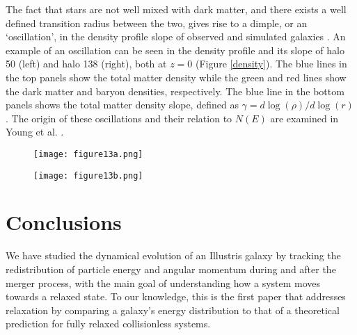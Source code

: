 \documentclass[a4paper,11pt]{article}
\begin{document}
The fact that stars are not well mixed with dark matter, and there exists a well defined transition radius between the two, gives rise to a dimple, or an 
`oscillation', in the density profile slope of observed \citep{Cha14,Tho07} and simulated galaxies \citep{Sch15a, Xu17}.  An 
example of an oscillation can be seen in the density profile and its slope of halo 50 (left) and halo 138 (right), both at $z=0$ (Figure \ref{density}).  The 
blue lines in the top panels show the total matter density while the green and red lines show the dark matter and baryon 
densities, respectively.  The blue line in the bottom panels shows the total matter density slope, defined as $\gamma=d\log(\rho)/d\log(r)$.  The origin of 
these oscillations and their relation to $N(E)$ are examined in Young et al. \citep{You16}. 

\begin{figure*}
\centering
\begin{subfigure}{.5\textwidth}
  \centering
\texttt{[image: figure13a.png]}
  \label{fig:sub1}
\end{subfigure}%
\begin{subfigure}{.5\textwidth}
  \centering
\texttt{[image: figure13b.png]}
  \label{fig:sub2}
\end{subfigure}
\caption{Top: The density profile for Illustris-1 halo 50 (left) and halo 138 (right) at $z=0$.  The blue line is the total matter profile while the green is 
dark matter, and the red is baryons. Bottom: The total matter density profile slope, where $\gamma=d\log(\rho)/d\log(r)$. For halo 50, there is a feature at 
$\log[r/(\text{kpc}/h)]\sim 0.25$ in the density profile slope indicating the dark matter to baryon transition region. This feature is not as pronounced in the halo 138 
density profile slope.  The dashed line and the dashed-dot line represent the softening length parameter for dark matter and baryons respectively.}
\label{density}
\end{figure*}


\section{Conclusions}\label{Conclusions}

We have studied the dynamical evolution of an Illustris galaxy by tracking the redistribution of particle energy and angular momentum during and after the 
merger process, with the main goal of understanding how a system moves towards a relaxed state.  To our knowledge, this is the first paper that addresses 
relaxation by comparing a galaxy's energy distribution to that of a theoretical prediction for fully relaxed collisionless systems.
\end{document}
